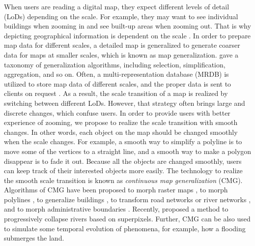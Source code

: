 \documentclass[twocolumn]{svjour3}          %
\begin{document}
When users are reading a digital map,
they expect different levels of detail (LoDs) depending on the scale.
For example, they may want to see individual buildings when zooming in
and see built-up areas when zooming out.
That is why depicting geographical information is dependent on the scale
\citep{Muller1995Generalization,Weibel1997}. 
In order to prepare map data for different scales,
a detailed map is generalized to generate coarser data 
for maps at smaller scales,
which is known as map generalization.
\citet{Mackaness2017Generalization} gave a taxonomy of 
generalization algorithms, 
including selection, simplification, aggregation, and so on.
Often, a multi-representation database (MRDB) is utilized to store
map data of different scales, 
and the proper data is sent to clients on request
\citep[\eg][]{Hampe2004multiple}.
As a result, the scale transition of a map is realized by switching 
between different LoDs. 
However, that strategy often brings large and discrete changes, 
which confuse users.
In order to provide users with better experience of zooming,
we propose to realize the scale transition with smooth changes.
In other words, each object on the map should be changed smoothly
when the scale changes.
For example, a smooth way to simplify a polyline is 
to move some of the vertices to a straight line,
and a smooth way to make a polygon disappear is to fade it out.
Because all the objects are changed smoothly,
users can keep track of their interested objects more easily.
The technology to realize the smooth scale transition is known as
\emph{continuous map generalization} (CMG).
Algorithms of CMG have been proposed 
to morph raster maps
\citep[\eg][]{Pantazis2009a,Pantazis2009b}, 
to morph polylines
\citep[\eg][]{Noellenburg2008,Peng2013LSA,Deng2015,Li2017Annealing,Li2018Fourier},
to generalize buildings
\citep[\eg][]{Li2017_Building,Peng2017Building,Touya2017Progressive},
to transform road networks or river networks
\citep[\eg][]{Suba2016Road,Chimani2014Eat,Huang2017Matrix,Peng2012River},
and to morph administrative boundaries
\citep[\eg][]{Peng2016Admin}.
Recently, \citet{Shen2020Collapse} proposed a method 
to progressively collapse rivers based on superpixels.
Further, CMG can be also used 
to simulate some temporal evolution of phenomena,
for example, how a flooding submerges the land.
\end{document}
